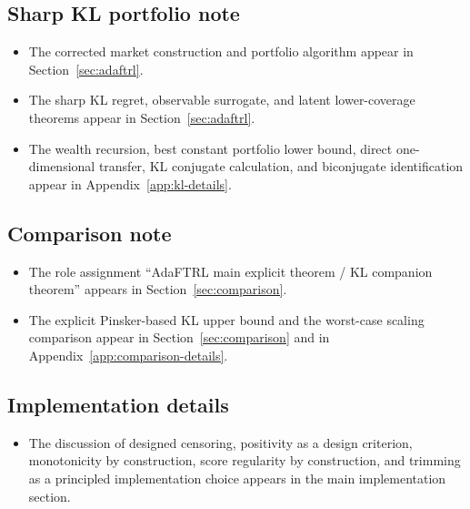 \documentclass[11pt]{article}
\newcommand{\1}{\mathbf{1}}
\begin{document}
\subsection*{Sharp KL portfolio note}
\begin{itemize}[leftmargin=*,itemsep=2pt]
  \item The corrected market construction and portfolio algorithm appear in Section~\ref{sec:adaftrl}.
  \item The sharp KL regret, observable surrogate, and latent lower-coverage theorems appear in Section~\ref{sec:adaftrl}.
  \item The wealth recursion, best constant portfolio lower bound, direct one-dimensional transfer, KL conjugate calculation, and biconjugate identification appear in Appendix~\ref{app:kl-details}.
\end{itemize}

\subsection*{Comparison note}
\begin{itemize}[leftmargin=*,itemsep=2pt]
  \item The role assignment ``AdaFTRL main explicit theorem / KL companion theorem'' appears in Section~\ref{sec:comparison}.
  \item The explicit Pinsker-based KL upper bound and the worst-case scaling comparison appear in Section~\ref{sec:comparison} and in Appendix~\ref{app:comparison-details}.
\end{itemize}

\subsection*{Implementation details}
\begin{itemize}[leftmargin=*,itemsep=2pt]
  \item The discussion of designed censoring, positivity as a design criterion, monotonicity by construction, score regularity by construction, and trimming as a principled implementation choice appears in the main implementation section.
\end{itemize}
\end{document}
